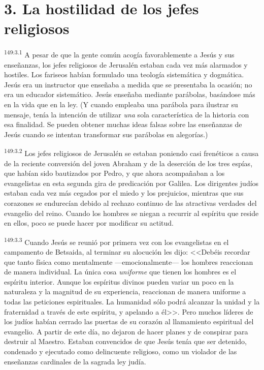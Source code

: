 \section*{3. La hostilidad de los jefes religiosos}
\par 
\textsuperscript{149:3.1} A pesar de que la gente común acogía favorablemente a Jesús y sus enseñanzas, los jefes religiosos de Jerusalén estaban cada vez más alarmados y hostiles. Los fariseos habían formulado una teología sistemática y dogmática. Jesús era un instructor que enseñaba a medida que se presentaba la ocasión; no era un educador sistemático. Jesús enseñaba mediante parábolas, basándose más en la vida que en la ley. (Y cuando empleaba una parábola para ilustrar su mensaje, tenía la intención de utilizar \textit{una} sola característica de la historia con esa finalidad. Se pueden obtener muchas ideas falsas sobre las enseñanzas de Jesús cuando se intentan transformar sus parábolas en alegorías.)

\par 
\textsuperscript{149:3.2} Los jefes religiosos de Jerusalén se estaban poniendo casi frenéticos a causa de la reciente conversión del joven Abraham y de la deserción de los tres espías, que habían sido bautizados por Pedro, y que ahora acompañaban a los evangelistas en esta segunda gira de predicación por Galilea. Los dirigentes judíos estaban cada vez más cegados por el miedo y los prejuicios, mientras que sus corazones se endurecían debido al rechazo continuo de las atractivas verdades del evangelio del reino. Cuando los hombres se niegan a recurrir al espíritu que reside en ellos, poco se puede hacer por modificar su actitud.

\par 
\textsuperscript{149:3.3} Cuando Jesús se reunió por primera vez con los evangelistas en el campamento de Betsaida, al terminar su alocución les dijo: <<Debéis recordar que tanto física como mentalmente ---emocionalmente--- los hombres reaccionan de manera individual. La única cosa \textit{uniforme} que tienen los hombres es el espíritu interior. Aunque los espíritus divinos pueden variar un poco en la naturaleza y la magnitud de su experiencia, reaccionan de manera uniforme a todas las peticiones espirituales. La humanidad sólo podrá alcanzar la unidad y la fraternidad a través de este espíritu, y apelando a él>>. Pero muchos líderes de los judíos habían cerrado las puertas de su corazón al llamamiento espiritual del evangelio. A partir de este día, no dejaron de hacer planes y de conspirar para destruir al Maestro. Estaban convencidos de que Jesús tenía que ser detenido, condenado y ejecutado como delincuente religioso, como un violador de las enseñanzas cardinales de la sagrada ley judía.

